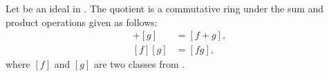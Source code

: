 \begin{theorem}
  Let \Ideal{} be an ideal in \Rx{}.
  The quotient \RxI{} is a commutative ring under the sum and product operations given as follows:
  \begin{align}
    [f] + [g] &= [f+g],\\
    [f][g] &= [fg],
  \end{align}
  where $[f]$ and $[g]$ are two classes from \RxI.
\end{theorem}
